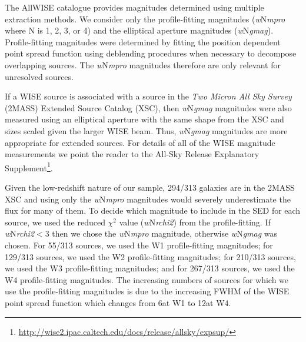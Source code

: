 \documentclass[fleqn, usenatbib]{mnras}
\begin{document}
The AllWISE catalogue provides magnitudes determined using multiple extraction methods. We consider only the profile-fitting magnitudes (\textit{w}N\textit{mpro} where N is 1, 2, 3, or 4) and the elliptical aperture magnitudes (\textit{w}N\textit{gmag}). Profile-fitting magnitudes were determined by fitting the position dependent point spread function using deblending procedures when necessary to decompose overlapping sources. The \textit{w}N\textit{mpro} magnitudes therefore are only relevant for unresolved sources.

If a WISE source is associated with a source in the \textit{Two Micron All Sky Survey} (2MASS) Extended Source Catalog (XSC), then \textit{w}N\textit{gmag} magnitudes were also measured using an elliptical aperture with the same shape from the XSC and sizes scaled given the larger WISE beam. Thus, \textit{w}N\textit{gmag} magnitudes are more appropriate for extended sources. For details of all of the WISE magnitude measurements we point the reader to the All-Sky Release Explanatory Supplement\footnote{\url{http://wise2.ipac.caltech.edu/docs/release/allsky/expsup/}}.

Given the low-redshift nature of our sample, {\color{red}294/313 galaxies are in the 2MASS XSC and} using only the \textit{w}N\textit{mpro} magnitudes would severely underestimate the flux for many of them. To decide which magnitude to include in the SED for each source, we used the reduced $\chi^{2}$ value (\textit{w}N\textit{rchi2}) from the profile-fitting. If \textit{w}N\textit{rchi2}$<3$ then we chose the \textit{w}N\textit{mpro} magnitude, otherwise \textit{w}N\textit{gmag} was chosen. For 55/313 sources, we used the W1 profile-fitting magnitudes; for 129/313 sources, we used the W2 profile-fitting magnitudes; for 210/313 sources, we used the W3 profile-fitting magnitudes; and for 267/313 sources, we used the W4 profile-fitting magnitudes. {\color{red}The increasing numbers of sources for which we use the profile-fitting magnitudes is due to the increasing FWHM of the WISE point spread function which changes from 6\arcsec at W1 to 12\arcsec at W4.}
\end{document}
